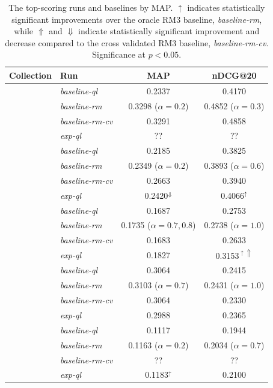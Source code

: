 \documentclass{article}
\begin{document}
\begin{table}[htbp]
\centering
\begin{tabular}{|c|l|c|c|} \hline
{\bf Collection} & {\bf Run} & {\bf MAP} & {\bf nDCG@20} \\ \hline\hline
\rule{0pt}{2.5ex} \multirow{3}{*}{AP} & {\it baseline-ql} & 0.2337 & 0.4170 \\ \cline{2-4}
\rule{0pt}{2.5ex} & {\it baseline-rm} & 0.3298 ($\alpha=0.2$) & 0.4852 ($\alpha=0.3$) \\ \cline{2-4}
\rule{0pt}{2.5ex} & {\it baseline-rm-cv} & 0.3291 & 0.4858 \\ \cline{2-4}
\rule{0pt}{2.5ex} & {\it exp-ql} & ?? & ?? \\ \hline\hline
\rule{0pt}{2.5ex} \multirow{3}{*}{Robust} & {\it baseline-ql} & 0.2185 & 0.3825 \\ \cline{2-4}
\rule{0pt}{2.5ex} & {\it baseline-rm} & 0.2349 ($\alpha=0.2$) & 0.3893 ($\alpha=0.6$) \\ \cline{2-4}
\rule{0pt}{2.5ex} & {\it baseline-rm-cv} & 0.2663 & 0.3940 \\ \cline{2-4}
\rule{0pt}{2.5ex} & {\it exp-ql} & 0.2420$^{\Downarrow}$ & 0.4066$^{\uparrow}$ \\ \hline\hline
\rule{0pt}{2.5ex} \multirow{3}{*}{wt10g} & {\it baseline-ql} & 0.1687 & 0.2753 \\ \cline{2-4}
\rule{0pt}{2.5ex} & {\it baseline-rm} & 0.1735 ($\alpha=0.7,0.8$) & 0.2738 ($\alpha=1.0$)\\ \cline{2-4}
\rule{0pt}{2.5ex} & {\it baseline-rm-cv} & 0.1683 & 0.2633 \\ \cline{2-4}
\rule{0pt}{2.5ex} & {\it exp-ql} & 0.1827 & 0.3153$^{\uparrow\Uparrow}$ \\ \hline\hline
\rule{0pt}{2.5ex} \multirow{3}{*}{blogs06} & {\it baseline-ql} & 0.3064 & 0.2415 \\ \cline{2-4}
\rule{0pt}{2.5ex} & {\it baseline-rm} & 0.3103 ($\alpha=0.7$) & 0.2431 ($\alpha=1.0$)\\ \cline{2-4}
\rule{0pt}{2.5ex} & {\it baseline-rm-cv} & 0.3064 & 0.2330 \\ \cline{2-4}
\rule{0pt}{2.5ex} & {\it exp-ql} & 0.2988 & 0.2365 \\ \hline\hline
\rule{0pt}{2.5ex} \multirow{3}{*}{clueweb09} & {\it baseline-ql} & 0.1117 & 0.1944 \\ \cline{2-4}
\rule{0pt}{2.5ex} & {\it baseline-rm} & 0.1163 ($\alpha=0.2$) & 0.2034 ($\alpha=0.7$) \\ \cline{2-4}
\rule{0pt}{2.5ex} & {\it baseline-rm-cv} & ?? & ?? \\ \cline{2-4}
\rule{0pt}{2.5ex} & {\it exp-ql} & 0.1183$^{\uparrow}$ & 0.2100 \\ \hline
\end{tabular}
\caption{The top-scoring runs and baselines by MAP. $\uparrow$ indicates statistically significant improvements over the oracle RM3 baseline, \textit{baseline-rm}, while $\Uparrow$ and $\Downarrow$ indicate statistically significant improvement and decrease compared to the cross validated RM3 baseline, \textit{baseline-rm-cv}. Significance at $p < 0.05$.}
\label{table.performance}
\end{table}
\end{document}
